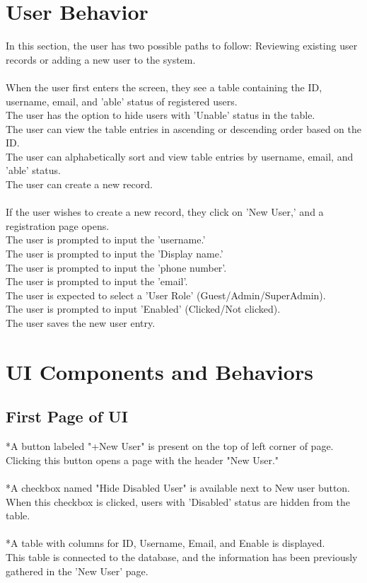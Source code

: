 \documentclass{article}
\begin{document}
\section{User Behavior}
In this section, the user has two possible paths to follow: Reviewing existing user records or adding a new user to the system.\\
\\
When the user first enters the screen, they see a table containing the ID, username, email, and 'able' status of registered users.\\ 
The user has the option to hide users with 'Unable' status in the table.\\ 
The user can view the table entries in ascending or descending order based on the ID.\\ 
The user can alphabetically sort and view table entries by username, email, and 'able' status.\\ 
The user can create a new record.\\ 
\\
If the user wishes to create a new record, they click on 'New User,' and a registration page opens.\\ 
The user is prompted to input the 'username.'\\ 
The user is prompted to input the 'Display name.'\\ 
The user is prompted to input the 'phone number'.\\ 
The user is prompted to input the 'email'.\\ 
The user is expected to select a 'User Role' (Guest/Admin/SuperAdmin).\\ 
The user is prompted to input 'Enabled' (Clicked/Not clicked).\\ 
The user saves the new user entry.\\ 

\section{UI Components and Behaviors}



\subsection{First Page of UI}

*A button labeled "+New User" is present on the top of left corner of page.\\Clicking this button opens a page with the header "New User."\\
\\
*A checkbox named "Hide Disabled User" is available next to New user button.\\
When this checkbox is clicked, users with 'Disabled' status are hidden from the table.\\
\\
*A table with columns for ID, Username, Email, and Enable is displayed.\\This table is connected to the database, and the information has been previously gathered in the 'New User' page.\\
\end{document}
